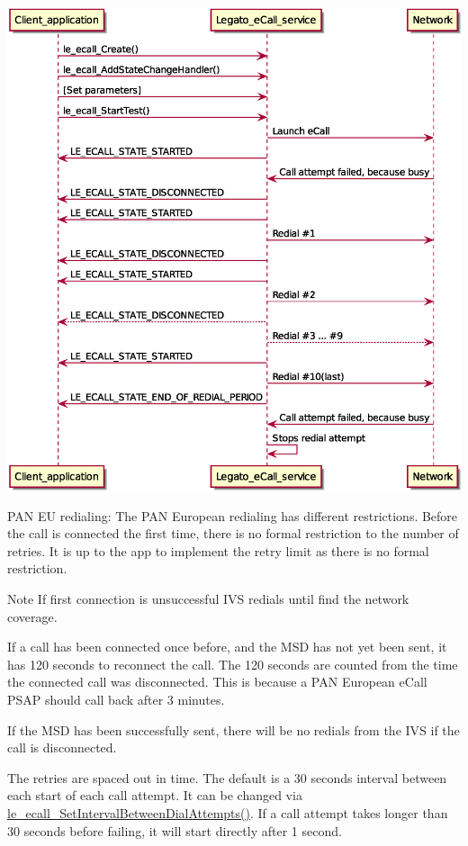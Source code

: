 \begin{DoxyImageNoCaption}
  \mbox{\includegraphics[width=\textwidth,height=\textheight/2,keepaspectratio=true]{EraGlonass_eCall_and_callFails}}
\end{DoxyImageNoCaption}


P\+AN EU redialing\+: The P\+AN European redialing has different restrictions. Before the call is connected the first time, there is no formal restriction to the number of retries. It is up to the app to implement the retry limit as there is no formal restriction.

\begin{DoxyNote}{Note}
If first connection is unsuccessful I\+VS redials until find the network coverage.
\end{DoxyNote}
If a call has been connected once before, and the M\+SD has not yet been sent, it has 120 seconds to reconnect the call. The 120 seconds are counted from the time the connected call was disconnected. This is because a P\+AN European e\+Call P\+S\+AP should call back after 3 minutes.

If the M\+SD has been successfully sent, there will be no redials from the I\+VS if the call is disconnected.

The retries are spaced out in time. The default is a 30 seconds interval between each start of each call attempt. It can be changed via \hyperlink{le__ecall__interface_8h_af90a8602d4b1d0cacaa3971c508dd188}{le\+\_\+ecall\+\_\+\+Set\+Interval\+Between\+Dial\+Attempts()}. If a call attempt takes longer than 30 seconds before failing, it will start directly after 1 second.

